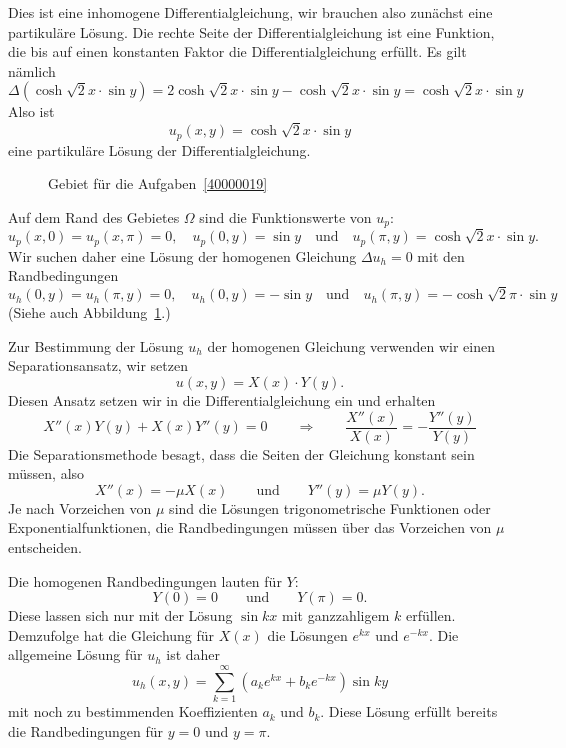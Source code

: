 \begin{loesung}
\begin{teilaufgaben}
\item
Dies ist eine inhomogene Differentialgleichung, wir brauchen also zunächst
eine partikuläre Lösung.
Die rechte Seite der Differentialgleichung ist eine Funktion, die bis auf
einen konstanten Faktor die Differentialgleichung erfüllt.
Es gilt nämlich
\[
\Delta (
\cosh \!\sqrt{2}x\cdot \sin y
)
=
2\cosh \!\sqrt{2}x\cdot \sin y
-\cosh\!\sqrt{2}x\cdot\sin y
=
\cosh \!\sqrt{2}x\cdot \sin y
\]
Also ist
\[
u_p(x,y)
=
\cosh \!\sqrt{2}x\cdot \sin y
\]
eine partikuläre Lösung der Differentialgleichung.
\item
\begin{figure}
\centering
{}
\caption{Gebiet für die Aufgaben~\ref{40000019}
\label{40000019:gebiet}}
\end{figure}
Auf dem Rand des Gebietes $\Omega$ sind die Funktionswerte von $u_p$:
\[
u_p(x,0) = u_p(x,\pi)=0,
\quad
u_p(0,y) = \sin y
\quad\text{und}\quad
u_p(\pi,y) = \cosh\!\sqrt{2}x\cdot \sin y.
\]
Wir suchen daher eine Lösung der homogenen Gleichung $\Delta u_h = 0$
mit den Randbedingungen
\[
u_h(0,y) = u_h(\pi,y) = 0,
\quad
u_h(0,y) = -\sin y
\quad\text{und}\quad
u_h(\pi,y) = -\cosh\!\sqrt{2}\pi\cdot \sin y
\]
(Siehe auch Abbildung~\ref{40000019:gebiet}.)
\item
Zur Bestimmung der Lösung $u_h$ der homogenen Gleichung verwenden wir einen
Separationsansatz, wir setzen
\[
u(x,y) = X(x)\cdot Y(y).
\]
Diesen Ansatz setzen wir in die Differentialgleichung ein und erhalten
\[
X''(x)Y(y) + X(x)Y''(y)=0
\qquad\Rightarrow\qquad
\frac{X''(x)}{X(x)} = -\frac{Y''(y)}{Y(y)}
\]
Die Separationsmethode besagt, dass die Seiten der Gleichung konstant
sein müssen, also
\[
X''(x) = -\mu X(x)
\qquad\text{und}\qquad
Y''(y) = \mu Y(y).
\]
Je nach Vorzeichen von $\mu$ sind die Lösungen trigonometrische Funktionen
oder Exponentialfunktionen, die Randbedingungen müssen über das Vorzeichen
von $\mu$ entscheiden.
\item
Die homogenen Randbedingungen lauten für $Y$: 
\[
Y(0)=0
\qquad\text{und}\qquad
Y(\pi)=0.
\]
Diese lassen sich nur mit der Lösung $\sin kx$ mit ganzzahligem $k$
erfüllen.
Demzufolge hat die Gleichung für $X(x)$ die Lösungen $e^{kx}$ und $e^{-kx}$.
Die allgemeine Lösung für $u_h$ ist daher
\[
u_h(x,y)
=
\sum_{k=1}^\infty (a_k e^{kx} + b_k e^{-kx})\sin ky
\]
mit noch zu bestimmenden Koeffizienten $a_k$ und $b_k$.
Diese Lösung erfüllt bereits die Randbedingungen für $y=0$ und $y=\pi$.
\item

\end{teilaufgaben}
\end{loesung}
